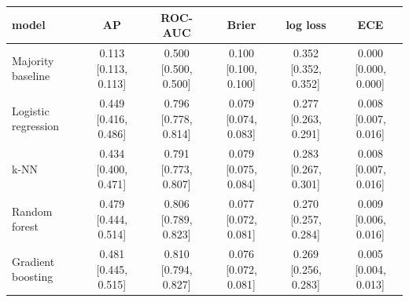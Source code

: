 \begin{tabular}{lccccc}
\toprule
model & AP & ROC-AUC & Brier & log loss & ECE \\
\midrule
Majority baseline & 0.113 [0.113, 0.113] & 0.500 [0.500, 0.500] & 0.100 [0.100, 0.100] & 0.352 [0.352, 0.352] & 0.000 [0.000, 0.000] \\
Logistic regression & 0.449 [0.416, 0.486] & 0.796 [0.778, 0.814] & 0.079 [0.074, 0.083] & 0.277 [0.263, 0.291] & 0.008 [0.007, 0.016] \\
k-NN & 0.434 [0.400, 0.471] & 0.791 [0.773, 0.807] & 0.079 [0.075, 0.084] & 0.283 [0.267, 0.301] & 0.008 [0.007, 0.016] \\
Random forest & 0.479 [0.444, 0.514] & 0.806 [0.789, 0.823] & 0.077 [0.072, 0.081] & 0.270 [0.257, 0.284] & 0.009 [0.006, 0.016] \\
Gradient boosting & 0.481 [0.445, 0.515] & 0.810 [0.794, 0.827] & 0.076 [0.072, 0.081] & 0.269 [0.256, 0.283] & 0.005 [0.004, 0.013] \\
\bottomrule
\end{tabular}
